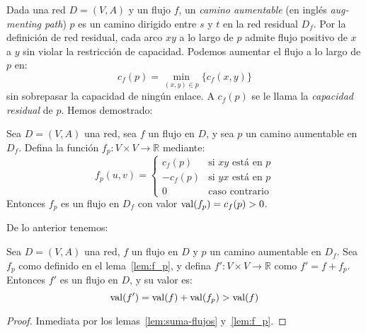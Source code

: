   Dada una red \(D = (V, A)\) y un flujo \(f\),
  un \emph{camino aumentable}
  (en inglés \emph{\foreignlanguage{english}{augmenting path}})
  \(p\)
  es un camino dirigido entre \(s\) y \(t\)
  en la red residual \(D_f\).
  Por la definición de red residual,
  cada arco \(x y\) a lo largo de \(p\)
  admite flujo positivo de \(x\) a \(y\)
  sin violar la restricción de capacidad.
  Podemos aumentar el flujo a lo largo de \(p\) en:
  \begin{equation*}
    c_f(p) = \min_{(x, y) \in p} \{c_f (x, y)\}
  \end{equation*}
  sin sobrepasar la capacidad de ningún enlace.
  A \(c_f(p)\) se le llama la \emph{capacidad residual} de \(p\).
  Hemos demostrado:
  \begin{lemma}
    \label{lem:f_p}
    Sea \(D = (V, A)\) una red,
    sea \(f\) un flujo en \(D\),
    y sea \(p\) un camino aumentable en \(D_f\).
    Defina la función
    \(f_p \colon V \times V \rightarrow \mathbb{R}\) mediante:
    \begin{equation*}
      f_p (u, v) =
      \begin{cases}
	c_f (p)	 & \text{si \(x y\) está en \(p\)} \\
	-c_f (p) & \text{si \(y x\) está en \(p\)} \\
	0	 & \text{caso contrario}
      \end{cases}
    \end{equation*}
    Entonces \(f_p\) es un flujo en \(D_f\)
    con valor\/ \(\operatorname{val}(f_p) = c_f(p) > 0\).
  \end{lemma}

  De lo anterior tenemos:
  \begin{corollary}
    \label{cor:f.prime}
    Sea \(D = (V, A)\) una red,
    \(f\) un flujo en \(D\)
    y \(p\) un camino aumentable en \(D_f\).
    Sea \(f_p\) como definido en el lema~\ref{lem:f_p},
    y defina \(f' \colon V \times V \rightarrow \mathbb{R}\)
    como \(f' = f + f_p\).
    Entonces \(f'\) es un flujo en \(D\),
    y su valor es:
    \begin{equation*}
      \operatorname{val}(f')
	= \operatorname{val}(f) + \operatorname{val}(f_p)
	> \operatorname{val}(f)
    \end{equation*}
  \end{corollary}
  \begin{proof}
    Inmediata por los lemas~\ref{lem:suma-flujos} y~\ref{lem:f_p}.
  \end{proof}

